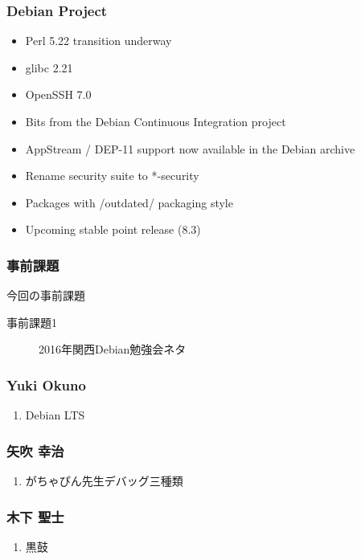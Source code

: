\documentclass[cjk,dvipdfmx,10pt,compress,%
hyperref={bookmarks=true,bookmarksnumbered=true,bookmarksopen=false,%
colorlinks=false,%
pdftitle={第 105 回 関西 Debian 勉強会},%
pdfauthor={倉敷・のがた・佐々木・かわだ},%
pdfsubject={資料},%
}]{beamer}
\begin{document}
\begin{frame}[fragile]
  \frametitle{Debian Project}
  \begin{itemize}
  \item Perl 5.22 transition underway
  \item glibc 2.21
  \item OpenSSH 7.0
  \item Bits from the Debian Continuous Integration project
  \item AppStream / DEP-11 support now available in the Debian archive
  \item Rename security suite to *-security
  \item Packages with /outdated/ packaging style
  \item Upcoming stable point release (8.3)
  \end{itemize}
\end{frame}



\begin{frame}[fragile]
  \frametitle{事前課題}
  \begin{block}{今回の事前課題}
    \begin{description}
    \item[事前課題1]
      2016年関西Debian勉強会ネタ
    \end{description}
  \end{block}
\end{frame}


\begin{frame}
  \frametitle{ Yuki Okuno }
  \begin{enumerate}
  \item Debian LTS
  \end{enumerate}
\end{frame}

\begin{frame}
  \frametitle{ 矢吹 幸治 }
  \begin{enumerate}
  \item がちゃぴん先生デバッグ三種類
  \end{enumerate}
\end{frame}

\begin{frame}
  \frametitle{ 木下 聖士 }
  \begin{enumerate}
  \item 黒鼓
  \end{enumerate}
\end{frame}
\end{document}
